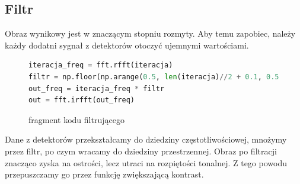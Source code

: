 \documentclass[polish,polish,a4paper]{article}
\begin{document}
				\subsection{Filtr}
					Obraz wynikowy jest w znaczącym stopniu rozmyty.
					Aby temu zapobiec, należy każdy dodatni sygnał z detektorów otoczyć ujemnymi wartościami.
					\begin{figure}[!h]
					\centering
						\begin{lstlisting}[language=Python, frame=single]
iteracja_freq = fft.rfft(iteracja)
filtr = np.floor(np.arange(0.5, len(iteracja)//2 + 0.1, 0.5 ))
out_freq = iteracja_freq * filtr
out = fft.irfft(out_freq)
						\end{lstlisting}
						\caption{fragment kodu filtrującego}
				\end{figure}
					
					Dane z detektorów przekształcamy do dziedziny częstotliwościowej,
					 mnożymy przez filtr, 
					 po czym wracamy do dziedziny przestrzennej.
					Obraz po filtracji znacząco zyska na ostrości, lecz utraci na rozpiętości tonalnej.
					Z tego powodu przepuszczamy go przez funkcję zwiększającą kontrast.
					
\end{document}
